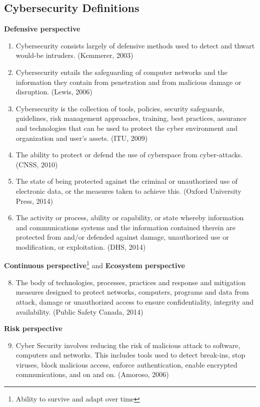 \subsection{Cybersecurity Definitions}
\textbf{Defensive perspective}

\begin{enumerate}
    \item Cybersecurity consists largely of defensive methods used to detect and thwart would-be intruders. (Kemmerer, 2003)
    \item Cybersecurity entails the safeguarding of computer networks and the information they contain from penetration and from malicious damage or disruption. (Lewis, 2006)
    \item Cybersecurity is the collection of tools, policies, security safeguards, guidelines, risk management approaches, training, best practices, assurance and technologies that can be used to protect the cyber environment and organization and user's assets. (ITU, 2009)
    \item The ability to protect or defend the use of cyberspace from cyber-attacks. (CNSS, 2010)
    \item The state of being protected against the criminal or unauthorized use of electronic data, or the measures taken to achieve this. (Oxford University Press, 2014)
    \item The activity or process, ability or capability, or state whereby information and communications systems and the information contained therein are protected from and/or defended against damage, unauthorized use or modification, or exploitation. (DHS, 2014)
\end{enumerate}

\textbf{Continuous perspective}\footnote{Ability to survive and adapt over time} and \textbf{Ecosystem perspective}

\begin{enumerate}
    \setcounter{enumi}{7}
    \item The body of technologies, processes, practices and response and mitigation measures designed to protect networks, computers, programs and data from attack, damage or unauthorized access to ensure confidentiality, integrity and availability. (Public Safety Canada, 2014)
\end{enumerate}

\textbf{Risk perspective}

\begin{enumerate}
    \setcounter{enumi}{8}
    \item Cyber Security involves reducing the risk of malicious attack to software, computers and networks. This includes tools used to detect break-ins, stop viruses, block malicious access, enforce authentication, enable encrypted communications, and on and on. (Amoroso, 2006)
\end{enumerate}

